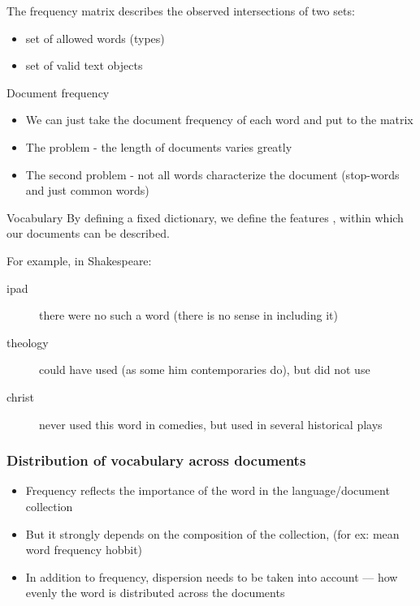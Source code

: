 \documentclass[svgnames]{beamer}
\begin{document}
\begin{frame}
  The frequency matrix describes the observed intersections of two
   sets:
   \begin{itemize}
   \item set of allowed words (types)
   \item set of valid text objects
   \end{itemize}
\end{frame}

\begin{frame}{Document frequency}
    \begin{itemize}
  \item We can just take the document frequency of each word and put to the matrix
  \item The problem - the length of documents varies greatly
  \item The second problem - not all words characterize the document (stop-words and just common words)

\end{itemize}
    \end{frame}

\begin{frame}{Vocabulary}
  By defining a fixed dictionary, we define the features , within which our
  documents can be described.

  For example, in Shakespeare:

  \begin{description}
  \item[ipad] there were no such a word (there is no sense in including it)
  \item[theology] could have used (as some him contemporaries do), but
    did not use
  \item[christ] never used this word in comedies, but
    used in several historical plays
  \end{description}
\end{frame}


\begin{frame}
  \frametitle{Distribution of vocabulary across documents}
  \begin{itemize}
  \item Frequency reflects the importance of the word in the language/document collection
  \item But it strongly depends on the composition of the collection, (for ex: mean word frequency \alert{hobbit})
  \item In addition to frequency, \alert{dispersion} needs to be taken into account —
    how evenly the word is distributed across the documents
  \end{itemize}
\end{frame}
\end{document}
